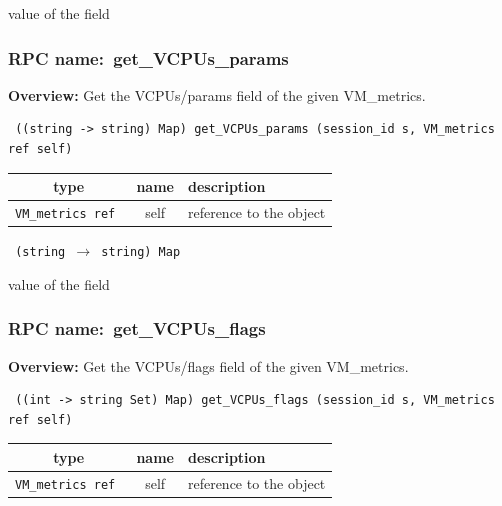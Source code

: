 value of the field
\vspace{0.3cm}
\vspace{0.3cm}
\vspace{0.3cm}
\subsubsection{RPC name:~get\_VCPUs\_params}

{\bf Overview:} 
Get the VCPUs/params field of the given VM\_metrics.

\begin{verbatim} ((string -> string) Map) get_VCPUs_params (session_id s, VM_metrics ref self)\end{verbatim}



 
\vspace{0.3cm}
\begin{tabular}{|c|c|p{7cm}|}
 \hline
{\bf type} & {\bf name} & {\bf description} \\ \hline
{\tt VM\_metrics ref } & self & reference to the object \\ \hline 

\end{tabular}

\vspace{0.3cm}

{\tt 
(string $\rightarrow$ string) Map
}


value of the field
\vspace{0.3cm}
\vspace{0.3cm}
\vspace{0.3cm}
\subsubsection{RPC name:~get\_VCPUs\_flags}

{\bf Overview:} 
Get the VCPUs/flags field of the given VM\_metrics.

\begin{verbatim} ((int -> string Set) Map) get_VCPUs_flags (session_id s, VM_metrics ref self)\end{verbatim}



 
\vspace{0.3cm}
\begin{tabular}{|c|c|p{7cm}|}
 \hline
{\bf type} & {\bf name} & {\bf description} \\ \hline
{\tt VM\_metrics ref } & self & reference to the object \\ \hline 

\end{tabular}

